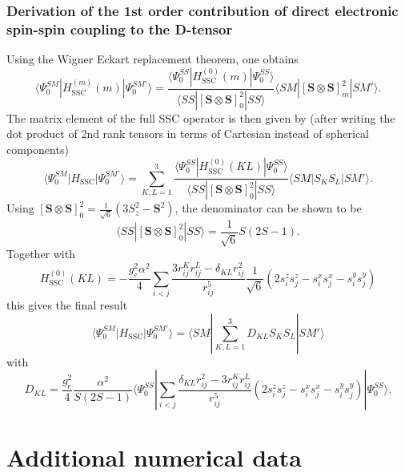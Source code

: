 \subsection{Derivation of the 1st order contribution of direct electronic spin-spin coupling to the D-tensor}
\label{Sec:DtensorSSC}
Using the Wigner Eckart replacement theorem,\cite{McWee_1992_} one obtains
\begin{equation}
\langle \Psi_0^{SM}|H_\text{SSC}^{(m)}(m)|\Psi_0^{SM'}\rangle = \frac{\langle \Psi_0^{SS}|H_\text{SSC}^{(0)}(m)|\Psi_0^{SS}\rangle}{\langle SS|[\mathbf{S}\otimes \mathbf{S}]^2_0|SS\rangle}\langle SM|[\mathbf{S}\otimes \mathbf{S}]^2_m|SM'\rangle.
\end{equation}
The matrix element of the full SSC operator is then given by (after writing the dot product of 2nd rank tensors in terms of Cartesian instead of spherical components)
\begin{equation}
\langle \Psi_0^{SM}|H_\text{SSC}|\Psi_0^{SM'}\rangle = \sum_{K,L=1}^3\frac{\langle \Psi_0^{SS}|H_\text{SSC}^{(0)}(KL)|\Psi_0^{SS}\rangle}{\langle SS|[\mathbf{S}\otimes \mathbf{S}]^2_0|SS\rangle}\langle SM|S_K S_L|SM'\rangle.
\end{equation}
Using $[\mathbf{S}\otimes \mathbf{S}]^2_0 = \frac{1}{\sqrt{6}}(3S_z^2 - \mathbf{S}^2)$, the denominator can be shown to be
\begin{equation}
\langle SS|[\mathbf{S}\otimes \mathbf{S}]^2_0|SS\rangle = \frac{1}{\sqrt{6}}S(2S-1).
\end{equation}
Together with
\begin{equation}
H_\text{SSC}^{(0)}(KL) = - \frac{g_e^2 \alpha^2}{4} \sum_{i<j} \frac{3r_{ij}^K r_{ij}^L - \delta_{KL} r_{ij}^2}{r_{ij}^5}\frac{1}{\sqrt{6}}(2 s_i^z s_j^z - s_i^x s_j^x - s_i^ys_j^y)
\end{equation}
this gives the final result
\begin{equation}
\langle \Psi_0^{SM}|H_\text{SSC}|\Psi_0^{SM'}\rangle = \langle SM|\sum_{K,L=1}^3 D_{KL}S_K S_L|SM'\rangle
\end{equation}
with
\begin{equation}
D_{KL} = \frac{g_e^2}{4}\frac{\alpha^2}{S(2S-1)} \langle \Psi_0^{SS}|\sum_{i<j} \frac{\delta_{KL} r_{ij}^2 - 3 r_{ij}^K r_{ij}^L}{r_{ij}^5}(2s_i^z s_j^z - s_i^x s_j^x - s_i^y s_j^y) | \Psi_0^{SS}\rangle.
\end{equation}

\chapter{Additional numerical data}
